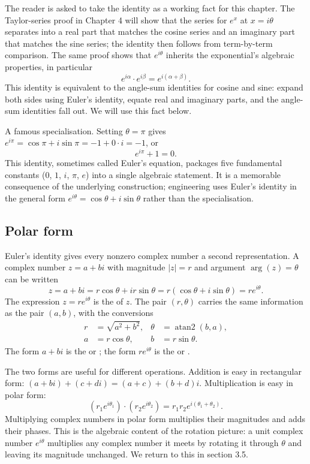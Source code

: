 The reader is asked to take the identity as a working fact for
this chapter. The Taylor-series proof in Chapter 4 will show that
the series for $e^{x}$ at $x = i\theta$ separates into a real part
that matches the cosine series and an imaginary part that matches
the sine series; the identity then follows from term-by-term
comparison. The same proof shows that $e^{i\theta}$ inherits the
exponential's algebraic properties, in particular
\[
e^{i\alpha} \cdot e^{i\beta} = e^{i(\alpha + \beta)}.
\]
This identity is equivalent to the angle-sum identities for
cosine and sine: expand both sides using Euler's identity, equate
real and imaginary parts, and the angle-sum identities fall out.
We will use this fact below.

A famous specialisation. Setting $\theta = \pi$ gives
$e^{i\pi} = \cos\pi + i\sin\pi = -1 + 0 \cdot i = -1$, or
\[
e^{i\pi} + 1 = 0.
\]
This identity, sometimes called Euler's equation, packages five
fundamental constants ($0$, $1$, $i$, $\pi$, $e$) into a single
algebraic statement. It is a memorable consequence of the
underlying construction; engineering uses Euler's identity in the
general form $e^{i\theta} = \cos\theta + i\sin\theta$ rather than
the specialisation.

\subsection{Polar form}

Euler's identity gives every nonzero complex number a second
representation. A complex number $z = a + bi$ with magnitude
$|z| = r$ and argument $\arg(z) = \theta$ can be written
\[
z = a + bi = r\cos\theta + ir\sin\theta = r(\cos\theta + i\sin\theta) = r e^{i\theta}.
\]
The expression $z = r e^{i\theta}$ is the  of
$z$. The pair $(r, \theta)$ carries the same information as the
pair $(a, b)$, with the conversions
\begin{align*}
r &= \sqrt{a^{2} + b^{2}}, & \theta &= \operatorname{atan2}(b, a), \\
a &= r\cos\theta, & b &= r\sin\theta.
\end{align*}
The form $a + bi$ is the  or
; the form $r e^{i\theta}$ is the
 or .

The two forms are useful for different operations. Addition is
easy in rectangular form: $(a + bi) + (c + di) = (a + c) +
(b + d)i$. Multiplication is easy in polar form:
\[
(r_{1} e^{i\theta_{1}}) \cdot (r_{2} e^{i\theta_{2}}) = r_{1} r_{2} e^{i(\theta_{1} + \theta_{2})}.
\]
Multiplying complex numbers in polar form multiplies their
magnitudes and adds their phases. This is the algebraic content
of the rotation picture: a unit complex number $e^{i\theta}$
multiplies any complex number it meets by rotating it through
$\theta$ and leaving its magnitude unchanged. We return to this
in section 3.5.

